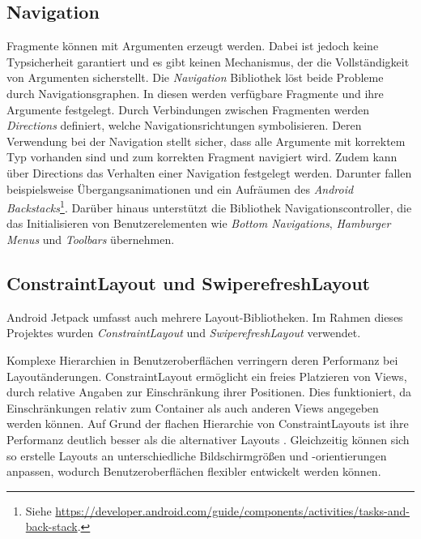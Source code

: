 \subsection{Navigation}
\label{subsec:app:jetpack:navigation}
Fragmente können mit Argumenten erzeugt werden.
Dabei ist jedoch keine Typsicherheit garantiert und es gibt keinen Mechanismus, der die Vollständigkeit von Argumenten sicherstellt.
Die \textit{Navigation} Bibliothek löst beide Probleme durch Navigationsgraphen.
In diesen werden verfügbare Fragmente und ihre Argumente festgelegt.
Durch Verbindungen zwischen Fragmenten werden \textit{Directions} definiert, welche Navigationsrichtungen symbolisieren.
Deren Verwendung bei der Navigation stellt sicher, dass alle Argumente mit korrektem Typ vorhanden sind und zum korrekten Fragment navigiert wird.
Zudem kann über Directions das Verhalten einer Navigation festgelegt werden.
Darunter fallen beispielsweise Übergangsanimationen und ein Aufräumen des \textit{Android Backstacks}\footnote{Siehe \url{https://developer.android.com/guide/components/activities/tasks-and-back-stack}.}.
Darüber hinaus unterstützt die Bibliothek Navigationscontroller, die das Initialisieren von Benutzerelementen wie \textit{Bottom Navigations}, \textit{Hamburger Menus} und \textit{Toolbars} übernehmen.


\subsection{ConstraintLayout und SwiperefreshLayout}
\label{subsec:app:jetpack:layouts}
Android Jetpack umfasst auch mehrere Layout-Bibliotheken.
Im Rahmen dieses Projektes wurden \textit{ConstraintLayout} und \textit{SwiperefreshLayout} verwendet.

Komplexe Hierarchien in Benutzeroberflächen verringern deren Performanz bei Layoutänderungen.
ConstraintLayout ermöglicht ein freies Platzieren von Views, durch relative Angaben zur Einschränkung ihrer Positionen.
Dies funktioniert, da Einschränkungen relativ zum Container als auch anderen Views angegeben werden können.
Auf Grund der flachen Hierarchie von ConstraintLayouts ist ihre Performanz deutlich besser als die alternativer Layouts \autocite{viewperformance}.
Gleichzeitig können sich so erstelle Layouts an unterschiedliche Bildschirmgrößen und -orientierungen anpassen, wodurch Benutzeroberflächen flexibler entwickelt werden können.

